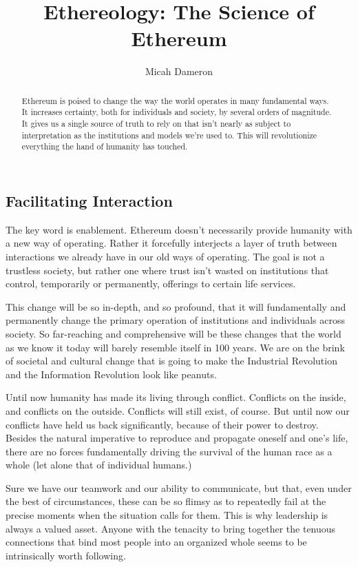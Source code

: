 \documentclass[a4paper,oneside]{article}
\title{Ethereology: The Science of Ethereum}
\author{Micah Dameron}
\begin{document}
\maketitle

\begin{abstract}
Ethereum is poised to change the way the world operates in many fundamental ways. It increases certainty, both for individuals and society, by several orders of magnitude. It gives us a single source of truth to rely on that isn't nearly as subject to interpretation as the institutions and models we're used to. This will revolutionize everything the hand of humanity has touched.
\end{abstract}

\tableofcontents

\begin{multicols}{2}

\section{Facilitating Interaction}
The key word is enablement. Ethereum  doesn't necessarily provide humanity with a new way of operating. Rather it forcefully interjects a layer of truth between interactions we already have in our old ways of operating. The goal is not a trustless society, but rather one where trust isn't wasted on institutions that control, temporarily or permanently, offerings to certain life services.

This change will be so in-depth, and so profound, that it will fundamentally and permanently change the primary operation of institutions and individuals across society. So far-reaching and comprehensive will be these changes that the world as we know it today will barely resemble itself in 100 years. We are on the brink of societal and cultural change that is going to make the Industrial Revolution and the Information Revolution look like peanuts. 

Until now humanity has made its living through conflict. Conflicts on the inside, and conflicts on the outside. Conflicts will still exist, of course. But until now our conflicts have held us back significantly, because of their power to destroy. Besides the natural imperative to reproduce and propagate oneself and one's life, there are no forces fundamentally driving the survival of the human race as a whole (let alone that of individual humans.) 

Sure we have our teamwork and our ability to communicate, but that, even under the best of circumstances, these can be so flimsy as to repeatedly fail at the precise moments when the situation calls for them. This is why leadership is always a valued asset. Anyone with the tenacity to bring together the tenuous connections that bind most people into an organized whole seems to be intrinsically worth following. 


\end{multicols}
\end{document}
